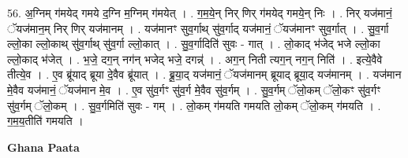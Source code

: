 \documentclass[17pt]{extarticle}
\begin{document}
56. अ॒ग्निम् ग॑मयेद् गमये द॒ग्नि म॒ग्निम् ग॑मयेत् । . ग॒म॒ये॒न् निर् णिर् ग॑मयेद् गमये॒न् निः । . निर् यज॑मानं॒ ॅयज॑मान॒म् निर् णिर् यज॑मानम् । . यज॑मानꣳ सुव॒र्गाथ् सु॑व॒र्गाद् यज॑मानं॒ ॅयज॑मानꣳ सुव॒र्गात् । . सु॒व॒र्गा ल्लो॒का ल्लो॒काथ् सु॑व॒र्गाथ् सु॑व॒र्गा ल्लो॒कात् । . सु॒व॒र्गादिति॑ सुवः - गात् । . लो॒काद् भ॑जेद् भजे ल्लो॒का ल्लो॒काद् भ॑जेत् । . भ॒जे॒ दग॒न् नग॑न् भजेद् भजे॒ दगन्न्॑ । . अग॒न् निती त्यग॒न् नग॒न् निति॑ । . इत्ये॒वैवे तीत्ये॒व । . ए॒व ब्रू॑याद् ब्रूया दे॒वैव ब्रू॑यात् । . ब्रू॒या॒द् यज॑मानं॒ ॅयज॑मानम् ब्रूयाद् ब्रूया॒द् यज॑मानम् । . यज॑मान मे॒वैव यज॑मानं॒ ॅयज॑मान मे॒व । . ए॒व सु॑व॒र्गꣳ सु॑व॒र्ग मे॒वैव सु॑व॒र्गम् । . सु॒व॒र्गम् ॅलो॒कम् ॅलो॒कꣳ सु॑व॒र्गꣳ सु॑व॒र्गम् ॅलो॒कम् । . सु॒व॒र्गमिति॑ सुवः - गम् । . लो॒कम् ग॑मयति गमयति लो॒कम् ॅलो॒कम् ग॑मयति । . ग॒म॒य॒तीति॑ गमयति । \newline

\textbf{Ghana Paata } \newline
\end{document}
